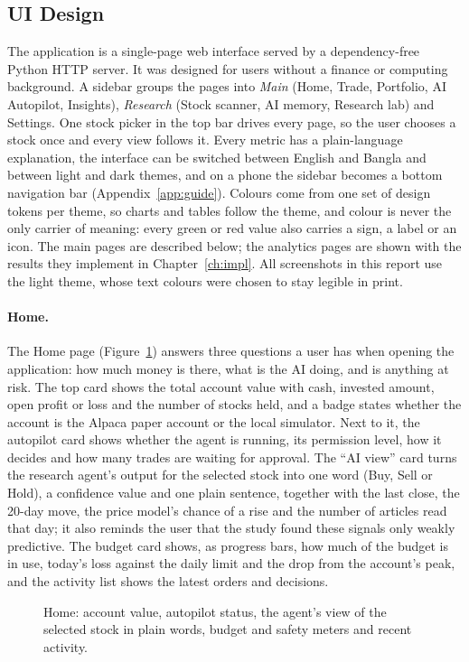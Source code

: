 \subsection{UI Design}
The application is a single-page web interface served by a dependency-free Python HTTP server. It was designed for users without a finance or computing background. A sidebar groups the pages into \emph{Main} (Home, Trade, Portfolio, AI Autopilot, Insights), \emph{Research} (Stock scanner, AI memory, Research lab) and Settings. One stock picker in the top bar drives every page, so the user chooses a stock once and every view follows it. Every metric has a plain-language explanation, the interface can be switched between English and Bangla and between light and dark themes, and on a phone the sidebar becomes a bottom navigation bar (Appendix~\ref{app:guide}). Colours come from one set of design tokens per theme, so charts and tables follow the theme, and colour is never the only carrier of meaning: every green or red value also carries a sign, a label or an icon. The main pages are described below; the analytics pages are shown with the results they implement in Chapter~\ref{ch:impl}. All screenshots in this report use the light theme, whose text colours were chosen to stay legible in print.

\paragraph{Home.} The Home page (Figure~\ref{fig:ui-home}) answers three questions a user has when opening the application: how much money is there, what is the AI doing, and is anything at risk. The top card shows the total account value with cash, invested amount, open profit or loss and the number of stocks held, and a badge states whether the account is the Alpaca paper account or the local simulator. Next to it, the autopilot card shows whether the agent is running, its permission level, how it decides and how many trades are waiting for approval. The ``AI view'' card turns the research agent's output for the selected stock into one word (Buy, Sell or Hold), a confidence value and one plain sentence, together with the last close, the 20-day move, the price model's chance of a rise and the number of articles read that day; it also reminds the user that the study found these signals only weakly predictive. The budget card shows, as progress bars, how much of the budget is in use, today's loss against the daily limit and the drop from the account's peak, and the activity list shows the latest orders and decisions.
\begin{figure}[!htbp]
\centering
{}
\caption{Home: account value, autopilot status, the agent's view of the selected stock in plain words, budget and safety meters and recent activity.}
\label{fig:ui-home}
\end{figure}

